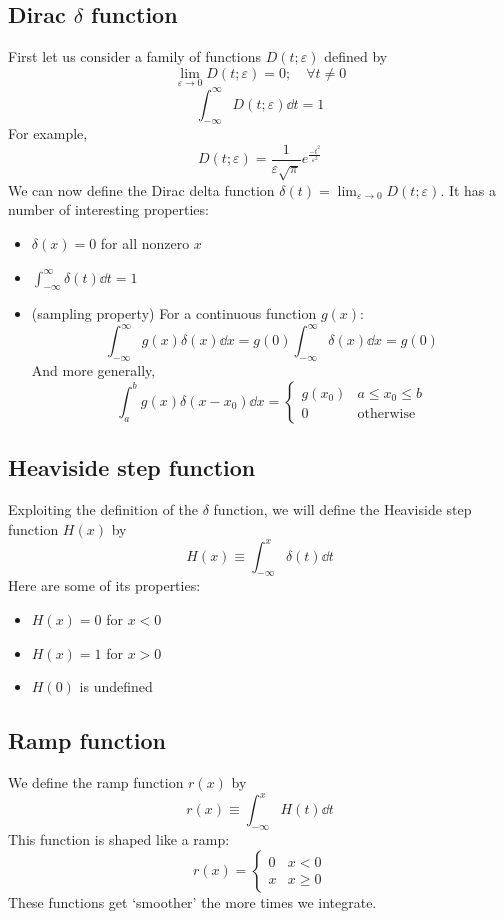 \subsection{Dirac \texorpdfstring{\( \delta \)}{𝛿} function}
First let us consider a family of functions \(D(t; \varepsilon)\) defined by
\[
	\lim_{\varepsilon \to 0} D(t; \varepsilon) = 0;\quad\forall t \neq 0
\]
\[
	\int_{-\infty}^\infty D(t;\varepsilon) \dd{t} = 1
\]
For example,
\[
	D(t; \varepsilon) = \frac{1}{\varepsilon\sqrt{\pi}}e^{\frac{-t^2}{\varepsilon^2}}
\]
We can now define the Dirac delta function \(\delta(t) = \lim_{\varepsilon \to 0} D(t; \varepsilon)\).
It has a number of interesting properties:
\begin{itemize}
	\item \(\delta(x) = 0\) for all nonzero \(x\)
	\item \(\int_{-\infty}^\infty \delta(t) \dd{t} = 1\)
	\item (sampling property) For a continuous function \(g(x)\):
	      \[
		      \int_{-\infty}^\infty g(x)\delta(x) \dd{x} = g(0)\int_{-\infty}^\infty \delta(x) \dd{x} = g(0)
	      \]
	      And more generally,
	      \[
		      \int_a^b g(x)\delta(x-x_0) \dd{x} = \begin{cases}
			      g(x_0) & a \leq x_0 \leq b \\
			      0      & \text{otherwise}
		      \end{cases}
	      \]
\end{itemize}

\subsection{Heaviside step function}
Exploiting the definition of the \(\delta\) function, we will define the Heaviside step function \(H(x)\) by
\[
	H(x) \equiv \int_{-\infty}^x \delta(t) \dd{t}
\]
Here are some of its properties:
\begin{itemize}
	\item \(H(x) = 0\) for \(x < 0\)
	\item \(H(x) = 1\) for \(x > 0\)
	\item \(H(0)\) is undefined
\end{itemize}

\subsection{Ramp function}
We define the ramp function \(r(x)\) by
\[
	r(x) \equiv \int_{-\infty}^x H(t) \dd{t}
\]
This function is shaped like a ramp:
\[
	r(x) = \begin{cases}
		0 & x < 0    \\
		x & x \geq 0
	\end{cases}
\]
These functions get `smoother' the more times we integrate.

